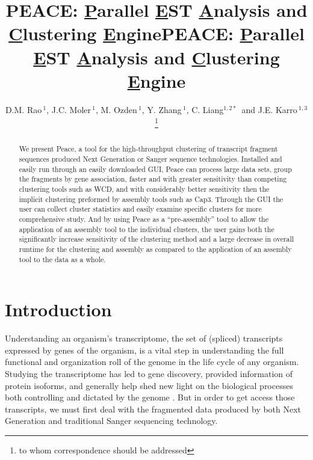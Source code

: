 \documentclass[a4,center,fleqn]{NAR}
\begin{document}

\title[PEACE cluster]{PEACE: {\underline P}arallel {\underline E}ST {\underline A}nalysis
  and {\underline C}lustering {\underline E}ngine}
\title{PEACE: {\underline P}arallel {\underline E}ST {\underline A}nalysis
  and {\underline C}lustering {\underline E}ngine}
\author{D.M. Rao\,$^{1}$, J.C. Moler\,$^{1}$, M. Ozden\,$^1$, Y. Zhang\,$^{1}$,
  C. Liang$^{1,2*}$\, and J.E. Karro\,$^{1,3}$\footnote{to whom
    correspondence should be addressed}}
\address{$^1$ Department of Computer Science and Software Engineering, \\
  $^2$ Department of Botany, \\
  $^3$ and Department of Microbiology, Miami University, Oxford, Ohio,
  USA}


\maketitle

\begin{abstract} 
  We present {\sc Peace}, a tool for the high-throughput clustering of
  transcript fragment sequences produced Next Generation or Sanger
  sequence technologies.  Installed and easily run through an easily
  downloaded GUI, {\sc Peace} can process large data sets, group the
  fragments by gene association, faster and with greater sensitivity
  than competing clustering tools such as {\sc WCD}, and with
  considerably better sensitivity then the implicit clustering
  preformed by assembly tools such as {\sc Cap3}.  Through the GUI the
  user can collect cluster statistics and easily examine specific
  clusters for more comprehensive study.  And by using {\sc Peace} as
  a ``pre-assembly'' tool to allow the application of an assembly tool
  to the individual clusters, the user gains both the significantly
  increase sensitivity of the clustering method and a large decrease
  in overall runtime for the clustering and assembly as compared to
  the application of an assembly tool to the data as a whole.
\end{abstract}


\section {Introduction}


Understanding an organism's transcriptome, the set of (spliced)
transcripts expressed by genes of the organism, is a vital step in
understanding the full functional and organization roll of the genome
in the life cycle of any organism.  Studying the transcriptome has led
to gene discovery, provided information of protein isoforms, and
generally help shed new light on the biological processes both
controlling and dictated by the genome \cite{Nagaraj07}.  But in order
to get access those transcripts, we must first deal with the
fragmented data produced by both Next Generation and traditional
Sanger sequencing technology.
\end{document}
